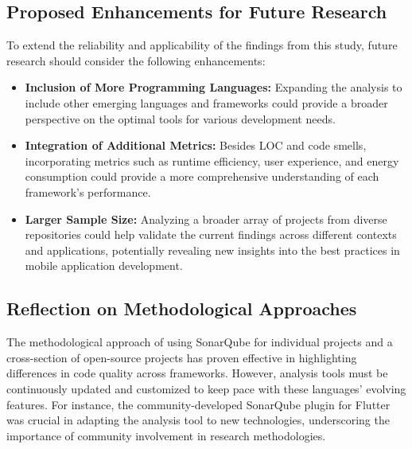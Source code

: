 \subsection{Proposed Enhancements for Future Research}
To extend the reliability and applicability of the findings from this study, future research should consider the following enhancements:
\begin{itemize}
    \item \textbf{Inclusion of More Programming Languages:} Expanding the analysis to include other emerging languages and frameworks could provide a broader perspective on the optimal tools for various development needs.
    \item \textbf{Integration of Additional Metrics: }Besides LOC and code smells, incorporating metrics such as runtime efficiency, user experience, and energy consumption could provide a more comprehensive understanding of each framework's performance.
    \item \textbf{Larger Sample Size: }Analyzing a broader array of projects from diverse repositories could help validate the current findings across different contexts and applications, potentially revealing new insights into the best practices in mobile application development.
\end{itemize}
\subsection{Reflection on Methodological Approaches}
The methodological approach of using SonarQube for individual projects and a cross-section of open-source projects has proven effective in highlighting differences in code quality across frameworks. However, analysis tools must be continuously updated and customized to keep pace with these languages' evolving features. For instance, the community-developed SonarQube plugin for Flutter was crucial in adapting the analysis tool to new technologies, underscoring the importance of community involvement in research methodologies.